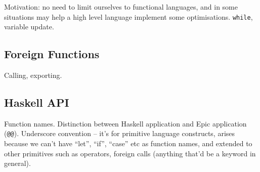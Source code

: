 Motivation: no need to limit ourselves to functional languages, and in
some situations may help a high level language implement some optimisations.
\texttt{while}, variable update.

\subsection{Foreign Functions}

Calling, exporting.

\subsection{Haskell API}

Function names. Distinction between Haskell application and Epic
application (\texttt{@@}). Underscore convention -- it's for primitive
language constructs, arises because we can't have ``let'', ``if'',
``case'' etc as function names, and extended to other primitives such
as operators, foreign calls (anything that'd be a keyword in general).
